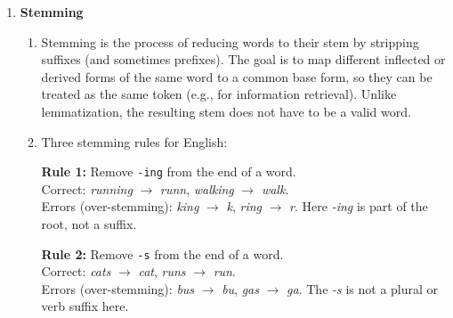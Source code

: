 \documentclass[11pt]{article}
\begin{document}
\begin{enumerate}
\begin{center}
\end{center}

States: $Q = \{q_0, q_1, q_2, q_3, q_4, q_5, q_6, q_7\}$, start: $q_0$, $F = \{q_4, q_5, q_7\}$.

\item \textbf{Stemming}

\begin{enumerate}

\item Stemming is the process of reducing words to their stem by stripping suffixes (and sometimes prefixes). The goal is to map different inflected or derived forms of the same word to a common base form, so they can be treated as the same token (e.g., for information retrieval). Unlike lemmatization, the resulting stem does not have to be a valid word.

\item Three stemming rules for English:

\textbf{Rule 1:} Remove \texttt{-ing} from the end of a word.\\
Correct: \emph{running} $\to$ \emph{runn}, \emph{walking} $\to$ \emph{walk}.\\
Errors (over-stemming): \emph{king} $\to$ \emph{k}, \emph{ring} $\to$ \emph{r}. Here \emph{-ing} is part of the root, not a suffix.

\textbf{Rule 2:} Remove \texttt{-s} from the end of a word.\\
Correct: \emph{cats} $\to$ \emph{cat}, \emph{runs} $\to$ \emph{run}.\\
Errors (over-stemming): \emph{bus} $\to$ \emph{bu}, \emph{gas} $\to$ \emph{ga}. The \emph{-s} is not a plural or verb suffix here.


\end{enumerate}
\end{enumerate}
\end{document}
